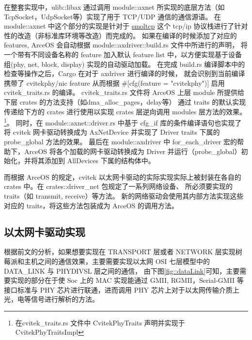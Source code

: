     在整套实现中，ulib::libax 通过调用 module::axnet 所实现的底层方法（如TcpSocket，UdpSocket等）实现了用于 TCP/UDP 通信的通信源语。
    在 module::axnet 中这个部分的实现是针对于 
    \href{https://github.com/smoltcp-rs/smoltcp}{smoltcp} 这个 tcp/ip 协议栈进行了针对性的改造（非标准库环境等改造）而完成的。
    如果在编译的时候添加了对应的 features, ArceOS 会自动根据 module::axdriver::build.rs 文件中所进行的声明，
    将一个带有不同设备名称的 feature 加入默认 feature list 中，以方便实现基于设备组(phy, net, block, display) 实现的自动驱动加载。
    在完成 build.rs 编译脚本中的检查等操作之后，Cargo 在对于 axdriver 进行编译的时候，
    就会识别到当前编译携带了 cvitekphy/nic feature 从而根据 \#[cfg(feature = "cvitekphy")] 启用 cvitek\_traits.rs 的编译。
    cvitek\_traits.rs 文件将 ArceOS 上层 module 所提供给下层 crates 的方法支持（如dma\_alloc\_pages，delay等）
    通过 traits 的默认实现传递给下方的 crates 进行使用以实现 crates 层逆向调用 modules 层方法的效果。
    \footnote{在cvitek\_traits.rs 文件中 CvitekPhyTraits 声明并实现于 CvitekPhyTraitsImpl }。
    同时，在 module::axnet::driver.rs 中基于 cfg\_if 库的条件编译语句也实现了将 cvitek 网卡驱动转换成为 AxNetDevice 
    并实现了 Driver traits 下属的 probe\_global 方法的效果。
    最后在 module::axdriver 中 for\_each\_driver 宏的帮助下，ArceOS 将各个加载的网卡驱动转换成为 
    Driver 并运行（probe\_global）初始化，并将其添加到 AllDevices 下属的结构体中。

    而根据 ArceOS 的规定，cvitek 以太网卡驱动的实际实现实际上被封装在各自的 crates 中。在 crates::driver\_net 包规定了一系列网络设备、
    所必须要实现的 traits（如 transmit, receive）等方法。
    新的网络驱动会使用其内部方法实现这些对应的 traits，将这些方法包装成为 ArceOS 的调用方法。

\subsection{以太网卡驱动实现}

    根据前文的分析，如果想要实现在 TRANSPORT 层或者 NETWORK 层实现树莓派和主机之间的通信效果，主要需要实现以太网 OSI 七层模型中的 DATA\_LINK 与 PHYDIVSL 层之间的通信，
    由下图\ref{fig::dataLink}可知，主要需要实现的部分在于使 Soc 上的 MAC 实现能通过 GMII, RGMII，Serial-GMII 等接口标准与 PHY 芯片进行联通，进而调用 PHY 芯片上对于以太网传输介质上光，电等信号进行解析的方法。
        
